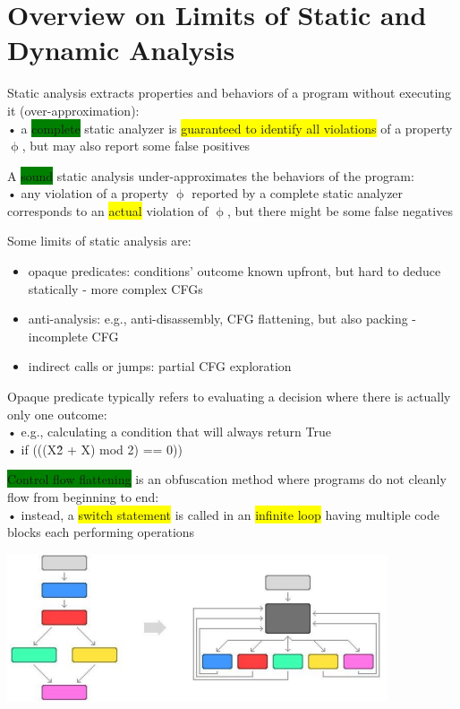 \documentclass[]{project_plan}
\begin{document}
\section{Overview on Limits of Static and Dynamic Analysis}

Static analysis extracts properties and behaviors of a program without executing it (over-approximation):\\
• a \colorbox{green}{complete} static analyzer is \colorbox{yellow}{guaranteed to identify all violations} of a property $\upphi$, but may also report some
false positives

A \colorbox{green}{sound} static analysis under-approximates the behaviors of the program:\\
• any violation of a property $\upphi$ reported by a complete static analyzer corresponds to an \colorbox{yellow}{actual} violation of $\upphi$,
but there might be some false negatives

Some limits of static analysis are:
\begin{itemize}
  \item opaque predicates: conditions’ outcome known upfront, but hard to deduce statically - more complex CFGs
  \item anti-analysis: e.g., anti-disassembly, CFG flattening, but also packing - incomplete CFG
  \item indirect calls or jumps: partial CFG exploration
\end{itemize}

Opaque predicate typically refers to evaluating a decision where there is actually only one
outcome:\\
• e.g., calculating a condition that will always return True\\
• if (((X\^2 + X) mod 2) == 0))

\colorbox{green}{Control flow flattening} is an obfuscation method where programs do not cleanly flow from
beginning to end:\\
• instead, a \colorbox{yellow}{switch statement} is called in an \colorbox{yellow}{infinite loop} having multiple code blocks each performing
operations

\includegraphics[width=.5\linewidth]{control flow flattening.png}
\end{document}
